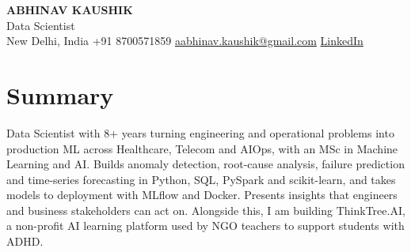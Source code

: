\documentclass[10pt,a4paper]{article}
\begin{document}
\begin{center}
  {\LARGE\bfseries ABHINAV KAUSHIK}\\[2pt]
  {\large Data Scientist}\\[2pt]
  New Delhi, India \textbar{} +91 8700571859 \textbar{} \href{mailto:aabhinav.kaushik@gmail.com}{aabhinav.kaushik@gmail.com} \textbar{} \href{https://www.linkedin.com/in/abhinav-kaushik10/}{LinkedIn}  
\end{center}

\section{Summary}
Data Scientist with 8+ years turning engineering and operational problems into production ML across Healthcare, Telecom and AIOps, with an MSc in Machine Learning and AI. Builds anomaly detection, root-cause analysis, failure prediction and time-series forecasting in Python, SQL, PySpark and scikit-learn, and takes models to deployment with MLflow and Docker. Presents insights that engineers and business stakeholders can act on. Alongside this, I am building ThinkTree.AI, a non-profit AI learning platform used by NGO teachers to support students with ADHD.
\end{document}
